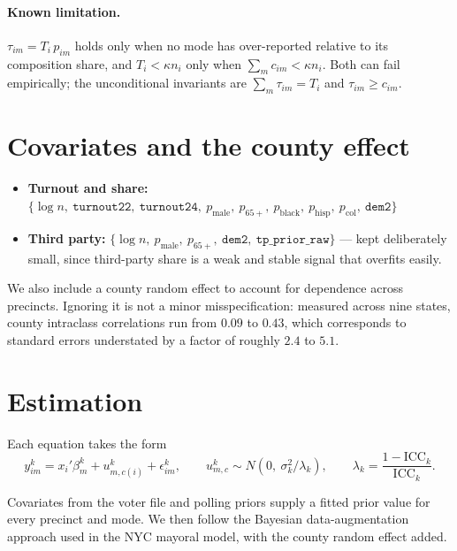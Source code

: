 \documentclass[11pt]{article}
\newcommand{\ICC}{\mathrm{ICC}}
\newcommand{\var}[1]{\texttt{#1}}
\begin{document}
\paragraph{Known limitation.}
$\tau_{im} = T_i\, p_{im}$ holds only when no mode has over-reported relative to its
composition share, and $T_i < \kappa n_i$ only when $\sum_m c_{im} < \kappa n_i$. Both
can fail empirically; the unconditional invariants are $\sum_m \tau_{im} = T_i$ and
$\tau_{im} \geq c_{im}$.

\section{Covariates and the county effect}

\begin{itemize}
  \item \textbf{Turnout and share:}
        $\{\log n,\ \var{turnout22},\ \var{turnout24},\ p_{\text{male}},\ p_{65+},\
        p_{\text{black}},\ p_{\text{hisp}},\ p_{\text{col}},\ \var{dem2}\}$
  \item \textbf{Third party:}
        $\{\log n,\ p_{\text{male}},\ p_{65+},\ \var{dem2},\ \var{tp\_prior\_raw}\}$ ---
        kept deliberately small, since third-party share is a weak and stable signal that
        overfits easily.
\end{itemize}

We also include a county random effect to account for dependence across precincts.
Ignoring it is not a minor misspecification: measured across nine states, county
intraclass correlations run from $0.09$ to $0.43$, which corresponds to standard errors
understated by a factor of roughly $2.4$ to $5.1$.

\section{Estimation}

Each equation takes the form
\begin{equation}
  y^{k}_{im} = x_i' \beta^{k}_{m} + u^{k}_{m,c(i)} + \epsilon^{k}_{im},
  \qquad
  u^{k}_{m,c} \sim N\!\left(0,\ \sigma_k^2 / \lambda_k\right),
  \qquad
  \lambda_k = \frac{1 - \ICC_k}{\ICC_k}.
  \label{eq:model}
\end{equation}

Covariates from the voter file and polling priors supply a fitted prior value for every
precinct and mode. We then follow the Bayesian data-augmentation approach used in the
NYC mayoral model, with the county random effect added.
\end{document}
